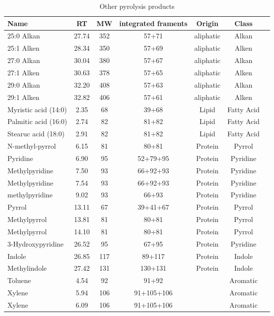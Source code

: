 \newpage
\begin{table}[h!]
\begin{center}
\caption{Other pyrolysis products}
\label{tab:nprod}
{\small
\begin{tabular}{lcccccc}
  \hline
Name & RT & MW & integrated framents & Origin & Class \\ 
  \hline
25:0 Alkan & 27.74 & 352 & 57+71 &aliphatic& Alkan \\ 
25:1 Alken & 28.34 & 350 & 57+69 &aliphatic& Alken \\ 
27:0 Alkan & 30.04 & 380 & 57+67 &aliphatic& Alkan \\ 
27:1 Alken & 30.63 & 378 & 57+65 &aliphatic& Alken \\ 
29:0 Alkan & 32.20 & 408 & 57+63 &aliphatic& Alkan \\ 
29:1 Alken & 32.82 & 406 & 57+61 &aliphatic& Alken \\ 
Myristic acid (14:0) & 2.35 & 68 & 39+68 & Lipid & Fatty Acid \\ 
Palmitic acid (16:0) & 2.74 & 82 & 81+82 & Lipid & Fatty Acid \\ 
Stearuc acid (18:0) & 2.91 & 82 & 81+82 & Lipid & Fatty Acid \\ 
N-methyl-pyrrol & 6.15 & 81 & 80+81 &Protein& Pyrrol \\ 
Pyridine & 6.90 & 95 & 52+79+95 &Protein& Pyridine \\ 
Methylpyridine & 7.50 & 93 & 66+92+93 &Protein& Pyridine \\ 
Methylpyridine & 7.54 & 93 & 66+92+93 &Protein& Pyridine \\ 
methylpyridine & 9.02 & 93 & 66+93 &Protein& Pyridine \\ 
Pyrrol & 13.11 & 67 & 39+41+67 &Protein& Pyrrol \\ 
Methylpyrrol & 13.81 & 81 & 80+81 &Protein& Pyrrol \\ 
Methylpyrrol & 14.10 & 81 & 80+81 &Protein& Pyrrol \\ 
3-Hydroxypyridine & 26.52 & 95 & 67+95 &Protein& Pyridine \\ 
Indole & 26.85 & 117 & 89+117 &Protein& Indole \\ 
Methylindole & 27.42 & 131 & 130+131 &Protein& Indole \\ 
Toluene & 4.54 & 92 & 91+92 &&Aromatic\\ 
Xylene & 5.94 & 106 & 91+105+106 &&Aromatic\\ 
Xylene & 6.09 & 106 & 91+105+106 &&Aromatic\\ 

\end{tabular}}
\end{center}
\end{table}
